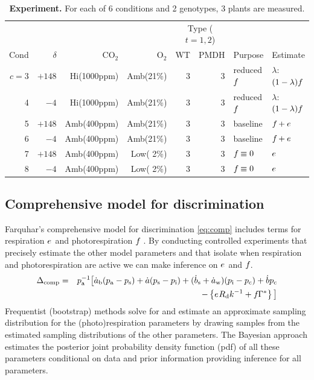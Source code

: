  \begin{table}[!hbtp]
  \begin{center}
\begin{tabular}{rrrrrrll}
\hline
     &          &             &           & \multicolumn{2}{c}{Type ($t=1,2$)} \\
Cond & $\delta$ & CO$_2$      & O$_2$     &  WT  & PMDH & Purpose     & Estimate \\
\hline
$c=3$&   $+148$ & Hi(1000ppm) & Amb(21\%) & 3    & 3 & reduced $f_{}$ & $\lambda$: $(1-\lambda)f_{}$\\
   4 &   $  -4$ & Hi(1000ppm) & Amb(21\%) & 3    & 3 & reduced $f_{}$ & $\lambda$: $(1-\lambda)f_{}$\\
   5 &   $+148$ & Amb(400ppm) & Amb(21\%) & 3    & 3 & baseline       & $f_{}+e_{}$\\
   6 &   $  -4$ & Amb(400ppm) & Amb(21\%) & 3    & 3 & baseline       & $f_{}+e_{}$\\
   7 &   $+148$ & Amb(400ppm) & Low( 2\%) & 3    & 3 & $f_{}\equiv 0$ & $e_{}$\\
   8 &   $  -4$ & Amb(400ppm) & Low( 2\%) & 3    & 3 & $f_{}\equiv 0$ & $e_{}$\\
\hline
\end{tabular}
\caption{{\bf Experiment.}  For each of 6 conditions and 2 genotypes, 3 plants are measured.}
\label{tab:design}
\end{center}
 \end{table}



\subsection{Comprehensive model for discrimination}

Farquhar's comprehensive model for discrimination \eqref{eq:comp}
  includes terms for respiration $e_{}$ and photorespiration $f_{}$ \citep{farquhar1982stomatal,farquhar1984isotopic}.
By conducting controlled experiments that
  precisely estimate the other model parameters
  and that isolate when respiration and photorespiration are active
  we can make inference on $e_{}$ and $f_{}$.
\begin{eqnarray}
  \sDeltacomp
    & = &
  \spa^{-1}
    \big\lbrack
      \sdotab(\spa-\sps)+\sdota(\sps-\spi)+(\sdotbs+\sdotaw)(\spi-\spc) + \sdotb\spc
\nonumber\\ %
    &&
    \qquad
      -
      \left\lbrace
        \sse\sRd\ssk^{-1} + \ssf\sGammastar
      \right\rbrace
    \big\rbrack
\label{eq:comp}
\end{eqnarray}
Frequentist (bootstrap) methods solve for and estimate an approximate sampling distribution for
  the (photo)respiration parameters by drawing samples from the
  estimated sampling distributions of the other parameters.
The Bayesian approach estimates the posterior joint probability density function (pdf)
  of all these parameters
  conditional on data and prior information
  providing inference for all parameters.

